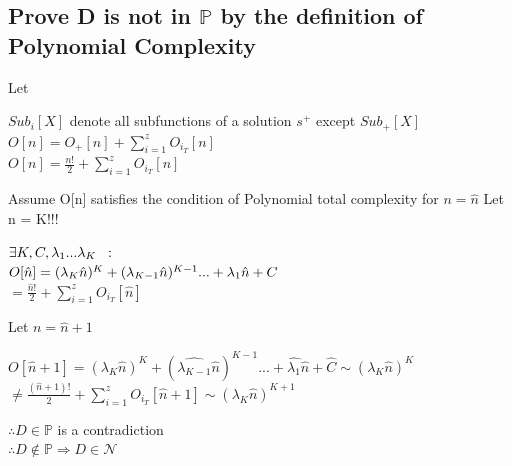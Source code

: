 \documentclass[11pt]{article}
\begin{document}
\subsection{Prove D is not in $\mathbb{P}$ by the definition of Polynomial Complexity}
Let
\begin{center}
$
Sub_i[X]$ denote all subfunctions of a solution $s^+$ except $Sub_+[X]
$
\\ \vspace{4mm}
$
O[n] = O_+[n] + \sum_{i=1}^z O_{i_T}[n]
$
\\ \vspace{3mm}
$
O[n] = \frac{n!}{2} + \sum_{i=1}^z O_{i_T}[n]
$
\end{center}
\vspace{6mm}
Assume O[n] satisfies the condition of Polynomial total complexity for $n = \hat{n}$ Let n = K!!!
\begin{center}
$\exists K,C,\lambda_1...\lambda_K \hspace{2mm} :$
\\ \vspace{2mm}
$O[\hat{n}] = (\lambda_K \hat{n})^K + (\lambda_{K-1} \hat{n})^{K-1}... + \lambda_1 \hat{n} + C \hspace{3mm}
$
\\ \vspace{2mm}
$
= \frac{\hat{n}!}{2} + \sum_{i=1}^z O_{i_T}[\hat{n}]
$
\end{center}
\vspace{5mm}
Let $n = \hat{n}+1$
\begin{center}
$
O[\hat{n} + 1] =  (\lambda_K \hat{n})^K + (\hat{\lambda_{K-1}} \hat{n})^{K-1}... + \hat{\lambda_1} \hat{n} +\hat{C} \sim (\lambda_K \hat{n})^K 
$
\\ \vspace{2mm}
$
\neq \frac{(\hat{n}+1)!}{2} + \sum_{i=1}^z O_{i_T}[\hat{n}+1] \sim (\lambda_K \hat{n})^{K+1}
$
\end{center}
\vspace{1mm}
\begin{center}
$
\therefore D \in \mathbb{P}$ is a contradiction
\\ \vspace{3mm}
$
\therefore D \not \in \mathbb{P} \Rightarrow D \in \mathcal{N}
$
\end{center}
\end{document}

